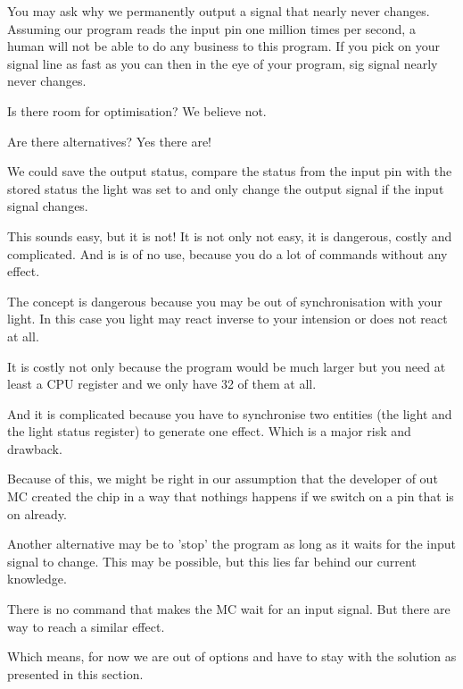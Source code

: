 You may ask why we permanently output a signal that nearly never changes. Assuming our program reads the input pin one million times per second, a human will not be able to do any business to this program. If you pick on your signal line as fast as you can then in the eye of your program, sig signal nearly never changes.

Is there room for optimisation? We believe not.

Are there alternatives? Yes there are!

We could save the output status, compare the status from the input pin with the stored status the light was set to and only change the output signal if the input signal changes.

This sounds easy, but it is not! It is not only not easy, it is dangerous, costly and complicated. And is is of no use, because you do a lot of commands without any effect.

The concept is dangerous because you may be out of synchronisation with your light. In this case you light may react inverse to your intension or does not react at all.

It is costly not only because the program would be much larger but you need at least a CPU register and we only have 32 of them at all.

And it is complicated because you have to synchronise two entities (the light and the light status register) to generate one effect. Which is a major risk and drawback.

Because of this, we might be right in our assumption that the developer of out \at MC created the chip in a way that nothings happens if we switch on a pin that is on already.

Another alternative may be to 'stop' the program as long as it waits for the input signal to change. This may be possible, but this lies far behind our current knowledge.

There is no command that makes the MC wait for an input signal. But there are way to reach a similar effect.

Which means, for now we are out of options and have to stay with the solution as presented in this section.